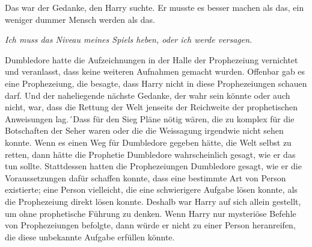 Das war der Gedanke, den Harry suchte. Er musste es besser machen als das, ein weniger dummer Mensch werden als das.

\emph{Ich muss das Niveau meines Spiels heben, oder ich werde versagen.}

Dumbledore hatte die Aufzeichnungen in der Halle der Prophezeiung vernichtet und veranlasst, dass keine weiteren Aufnahmen gemacht wurden. Offenbar gab es eine Prophezeiung, die besagte, dass Harry nicht in diese Prophezeiungen schauen darf.
Und der naheliegende nächste Gedanke, der wahr sein könnte oder auch nicht, war, dass die Rettung der Welt jenseits der Reichweite der prophetischen Anweisungen lag.´Dass für den Sieg Pläne nötig wären, die zu komplex für die Botschaften der Seher waren oder die die Weissagung irgendwie nicht sehen konnte. Wenn es einen Weg für Dumbledore gegeben hätte, die Welt selbst zu retten, dann hätte die Prophetie Dumbledore wahrscheinlich gesagt, wie er das tun sollte. Stattdessen hatten die Prophezeiungen Dumbledore gesagt, wie er die Voraussetzungen dafür schaffen konnte, dass eine bestimmte Art von Person existierte; eine Person vielleicht, die eine schwierigere Aufgabe lösen konnte, als die Prophezeiung direkt lösen konnte. Deshalb war Harry auf sich allein gestellt, um ohne prophetische Führung zu denken. Wenn Harry nur mysteriöse Befehle von Prophezeiungen befolgte, dann würde er nicht zu einer Person heranreifen, die diese unbekannte Aufgabe erfüllen könnte.

